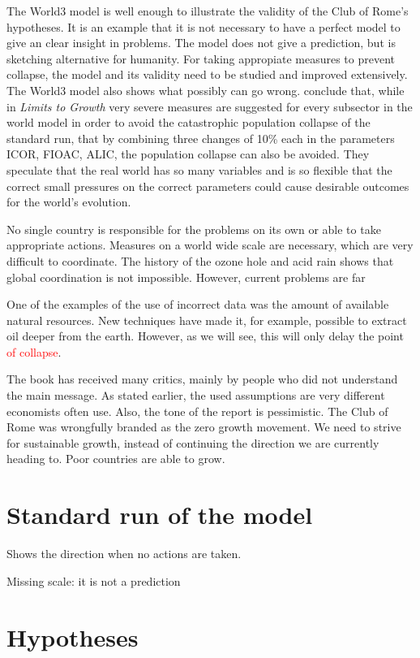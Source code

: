 \documentclass[10pt,a4paper]{scrartcl}
\begin{document}
The World3 model is well enough to illustrate the validity of the Club of Rome's hypotheses. It is an example that it is not necessary to have a perfect model to give an clear insight in problems. The model does not give a prediction, but is sketching alternative for humanity. For taking appropiate measures to prevent collapse, the model and its validity need to be studied and improved extensively. The World3 model also shows what possibly can go wrong. \cite{vermeulen1976parameter} conclude that, while in \emph{Limits to Growth} very severe measures are suggested for every subsector in the world model in order to avoid the catastrophic population collapse of the standard run, that by combining three changes of 10\% each in the parameters ICOR, FIOAC, ALIC, the population collapse can also be avoided. They speculate that the real world has so many variables and is so flexible that the correct small pressures on the correct parameters could cause desirable outcomes for the world's evolution.

No single country is responsible for the problems on its own or able to take appropriate actions. Measures on a world wide scale are necessary, which are very difficult to coordinate. The history of the ozone hole and acid rain shows that global coordination is not impossible. However, current problems are far

One of the examples of the use of incorrect data was the amount of available natural resources. New techniques have made it, for example, possible to extract oil deeper from the earth. However, as we will see, this will only delay the point \textcolor{red}{of collapse}.

The book has received many critics, mainly by people who did not understand the main message. As stated earlier, the used assumptions are very different economists often use. Also, the tone of the report is pessimistic. The Club of Rome was wrongfully branded as the zero growth movement. We need to strive for sustainable growth, instead of continuing the direction we are currently heading to. Poor countries are able to grow.

\section*{Standard run of the model}

Shows the direction when no actions are taken.

Missing scale: it is not a prediction

\section*{Hypotheses}
\end{document}
